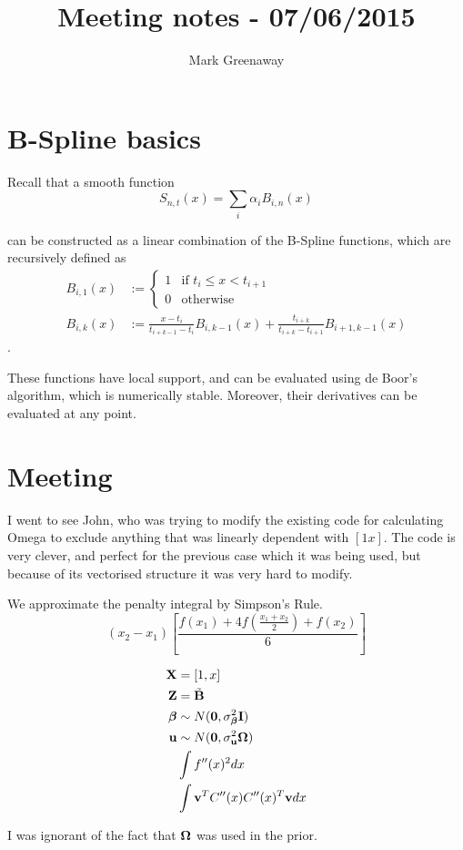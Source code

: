 \documentclass{article}[12pt]
\title{Meeting notes - 07/06/2015}
\author{Mark Greenaway}
\begin{document}
\maketitle

\section{B-Spline basics}

Recall that a smooth function
\[
	S_{n, t}(x) = \sum_i \alpha_i B_{i, n} (x)
\]

can be constructed as a linear combination of the B-Spline functions, which are recursively
defined as
\begin{align*}
	B_{i, 1} (x) &:= 
	\begin{cases}
		1 & \text{if } t_i \leq x < t_{i + 1} \\
		0 & \text{otherwise}
	\end{cases} \\
	B_{i, k} (x) &:= \frac{x - t_i}{t_{i + k - 1} - t_i} B_{i, k - 1}(x) +
									\frac{t_{i + k}}{t_{i + k} - t_{i + 1}} B_{i + 1, k - 1} (x)
\end{align*}.

These functions have local support, and can be evaluated using de Boor's algorithm,
which is numerically stable. Moreover, their derivatives can be evaluated at any point.

\section{Meeting}

I went to see John, who was trying to modify the existing code for calculating Omega
to exclude anything that was linearly dependent with $[1 x]$. The code is very clever,
and perfect for the previous case which it was being used, but because of its vectorised
structure it was very hard to modify.

We approximate the penalty integral by Simpson's Rule.
\[
	(x_2 - x_1) \left [\frac{f(x_1) + 4 f(\frac{x_1 + x_2}{2}) + f(x_2)}{6} \right ]
\]

\begin{align*}
	{\bf X} &= [1, x] \\
	{\bf Z} &= \tilde {{\bf B}} \\
	{\boldsymbol \beta} &\sim N({\bf 0}, \sigma_{\boldsymbol \beta}^2 {\bf I}) \\
	{\bf u} &\sim N({\bf 0}, \sigma_{\bf u}^2 {\boldsymbol \Omega}) \\
	&\int f''(x)^2 dx \\
	&\int {\bf v}^T C''(x) C''(x)^T {\bf v} dx
\end{align*}

I was ignorant of the fact that ${\boldsymbol \Omega}$ was used in the prior.
\end{document}
